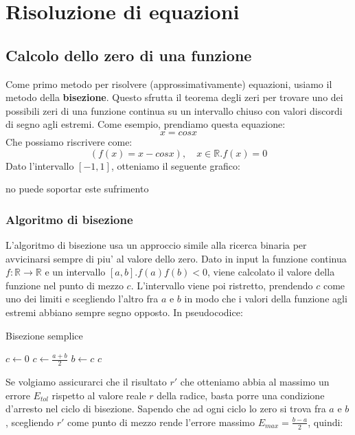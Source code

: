 \chapter{Risoluzione di equazioni}
\section{Calcolo dello zero di una funzione}
Come primo metodo per risolvere (approssimativamente) equazioni, usiamo il metodo della \textbf{bisezione}. Questo sfrutta il teorema degli zeri per trovare uno dei possibili zeri di una funzione continua su un intervallo chiuso con valori discordi di segno agli estremi. Come esempio, prendiamo questa equazione:
\[
x = cos x
\]
Che possiamo riscrivere come:
\[
  (f(x) = x-cos x), \quad x \in \mathbb{R}. f(x) = 0
\]
Dato l'intervallo $ [-1, 1] $, otteniamo il seguente grafico:
\begin{center}
    no puede soportar este sufrimento
\end{center}
\subsection{Algoritmo di bisezione}
L'algoritmo di bisezione usa un approccio simile alla ricerca binaria per avvicinarsi sempre di piu' al valore dello zero. Dato in input la funzione continua $ f:\mathbb{R}\to\mathbb{R} $ e un intervallo $ [a,b]. f(a)f(b)<0 $, viene calcolato il valore della funzione nel punto di mezzo $ c $. L'intervallo viene poi ristretto, prendendo $ c $ come uno dei limiti e scegliendo l'altro fra $ a $ e $ b $ in modo che i valori della funzione agli estremi abbiano sempre segno opposto. In pseudocodice:

\begin{algorithm}[H]
\caption{Bisezione semplice}
\SetAlgoLined
\SetNoFillComment
\vspace{3mm}
$c \leftarrow 0$\;
 {
    $ c \gets \frac{a+b}{2} $\;
     {
      $ b \gets c $
    }
}
\Return $ c $
\end{algorithm}

\vspace{3mm}
Se volgiamo assicurarci che il risultato $ r' $ che otteniamo abbia al massimo un errore $ E_{tol} $ rispetto al valore reale $ r $ della radice, basta porre una condizione d'arresto nel ciclo di bisezione. Sapendo che ad ogni ciclo lo zero si trova fra $ a $ e $ b $, scegliendo $ r' $ come punto di mezzo rende l'errore massimo $ E_{max} = \frac{b-a}{2} $, quindi:

